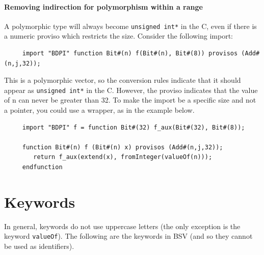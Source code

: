 \documentclass[twoside,letterpaper]{article}
\newcommand{\hm}{\hspace*{1em}}
\newcommand{\BSV}{BSV}
\newcommand{\te}[1]{\texttt{#1}}
\begin{document}
\paragraph{Removing indirection for polymorphism within a range}
A polymorphic type will always become \te{unsigned int*} in the C,
even if there is a numeric proviso which restricts the size.  
Consider the following import:
\begin{verbatim}
     import "BDPI" function Bit#(n) f(Bit#(n), Bit#(8)) provisos (Add#(n,j,32));
\end{verbatim}
This is a polymorphic vector, so the conversion rules indicate that it
should  appear as \te{unsigned int*} in the C. However, the proviso
indicates  that the value of n can never be greater than 32. 
  To make
the import be a specific size and not a pointer, you could use a
wrapper, as in the example below.
\begin{verbatim}
     import "BDPI" f = function Bit#(32) f_aux(Bit#(32), Bit#(8));

     function Bit#(n) f (Bit#(n) x) provisos (Add#(n,j,32));
        return f_aux(extend(x), fromInteger(valueOf(n)));
     endfunction
\end{verbatim}







\vfill

\hm


\pagebreak

\appendix


\section{Keywords}

\label{sec-keywords}

In general, keywords do not use uppercase letters (the only exception
is the keyword \texttt{valueOf}). The following are the keywords in
{\BSV} (and so they cannot be used as identifiers).
\end{document}
